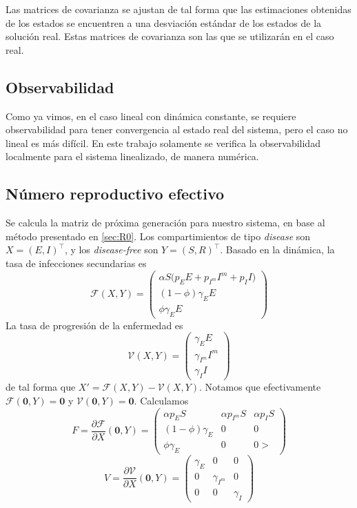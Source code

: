 Las matrices de covarianza se ajustan de tal forma que las estimaciones obtenidas de los estados se encuentren a una desviación estándar de los estados de la solución real. Estas matrices de covarianza son las que se utilizarán en el caso real.





\subsection{Observabilidad}

Como ya vimos, en el caso lineal con dinámica constante, se requiere observabilidad para tener convergencia al estado real del sistema, pero el caso no lineal es más difícil. En este trabajo solamente se verifica la observabilidad localmente para el sistema linealizado, de manera numérica. 

\subsection{Número reproductivo efectivo}



Se calcula la matriz de próxima generación para nuestro sistema, en base al método presentado en \ref{sec:R0}. Los compartimientos de tipo \textit{disease} son \(X = (E, I)^{\top}\), y los \textit{disease-free} son \( Y = (S, R)^{\top}\). Basado en la dinámica, la tasa de infecciones secundarias es 
\[
\mathcal{F}(X,Y) = 
\begin{pmatrix}
\alpha S \big( p_E E + p_{I^m} I^m + p_I I \big) \\
(1-\phi) \gamma_E  E \\
\phi \gamma_E  E 
\end{pmatrix}
\]
La tasa de progresión de la enfermedad es 
\[
\mathcal{V}(X,Y) = 
\begin{pmatrix}
\gamma_E E \\
\gamma_{I^m} I^m \\
\gamma_{I} I
\end{pmatrix}
\]
de tal forma que \(X' = \mathcal{F}(X,Y) - \mathcal{V}(X,Y)\). Notamos que efectivamente \(\mathcal{F}(\mathbf{0},Y) = \mathbf{0}\) y \(\mathcal{V}(\mathbf{0},Y) = \mathbf{0}\). 
Calculamos 
\[
F = \frac{\partial \mathcal{F}}{\partial X}(\mathbf{0},Y) = 
\begin{pmatrix}
\alpha p_E S & \alpha p_{I^m} S & \alpha p_I S \\
(1-\phi)\gamma_E & 0 & 0 \\
\phi\gamma_E & 0 & 0>
 \end{pmatrix}
\]
\[
V = \frac{\partial \mathcal{V}}{\partial X}(\mathbf{0},Y) = 
\begin{pmatrix}
\gamma_E & 0 & 0 \\
0 & \gamma_{I^m} & 0 \\
0 & 0 & \gamma_I
 \end{pmatrix}
\]

